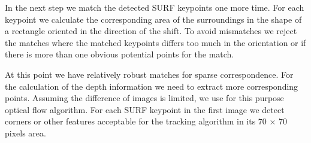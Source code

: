 In the next step we match the detected SURF keypoints one more time.
For each keypoint we calculate the corresponding area of the surroundings in the shape of a rectangle oriented in the direction of the shift. 
To avoid mismatches we reject the matches where the matched keypoints differs too much in the orientation or if there is more than one obvious potential points for the match.



At this point we have relatively robust matches for sparse correspondence. 
For the calculation of the depth information we need to extract more corresponding points.
Assuming the difference of images is limited, we use for this purpose optical flow algorithm. 
For each SURF keypoint in the first image we detect corners or other features acceptable for the tracking algorithm in its 70 $\times$ 70 pixels area.

